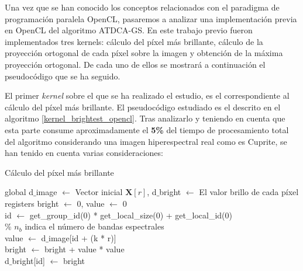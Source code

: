 Una vez que se han conocido los conceptos relacionados con el paradigma de programación paralela OpenCL, pasaremos a analizar una implementación previa en OpenCL del algoritmo ATDCA-GS. En este trabajo previo \cite{portabilitySPIE_Sergio} fueron implementados tres kernels: cálculo del píxel más brillante, cálculo de la proyección ortogonal de cada píxel sobre la imagen y obtención de la máxima proyección ortogonal. De cada uno de ellos se mostrará a continuación el pseudocódigo que se ha seguido.


El primer \textit{kernel} sobre el que se ha realizado el estudio, es el correspondiente al cálculo del píxel más brillante. El pseudocódigo estudiado es el descrito en el algoritmo \ref{kernel_brightest_opencl}. Tras analizarlo y teniendo en cuenta que esta parte consume aproximadamente el \textbf{5\%} del tiempo de procesamiento total del algoritmo considerando una imagen hiperespectral real como es Cuprite, se han tenido en cuenta varias consideraciones: 

\begin{algorithm}[htb]\small
\caption{Cálculo del píxel más brillante}
\begin{algorithmic}[1]
\label{kernel_brightest_opencl}
\STATE global d$\_$image $\leftarrow{}$ Vector inicial $\textbf{X}$$[r]$, d$\_$bright $\leftarrow{}$ El valor brillo de cada píxel\\
\STATE registers bright $\leftarrow{}$ 0, value $\leftarrow{}$ 0\\
\STATE id $\leftarrow{}$ get\_group\_id(0) * get\_local\_size(0) +
get\_local\_id(0)\\
\% $n_{b}$ indica el número de bandas espectrales\\ 
\STATE value $\leftarrow{}$ d$\_$image[id + (k * r)]\\
\STATE bright $\leftarrow{}$ bright + value * value\\
\ENDFOR 
\STATE d$\_$bright[id] $\leftarrow{}$ bright\\
\ENDIF
\end{algorithmic}
\end{algorithm}

